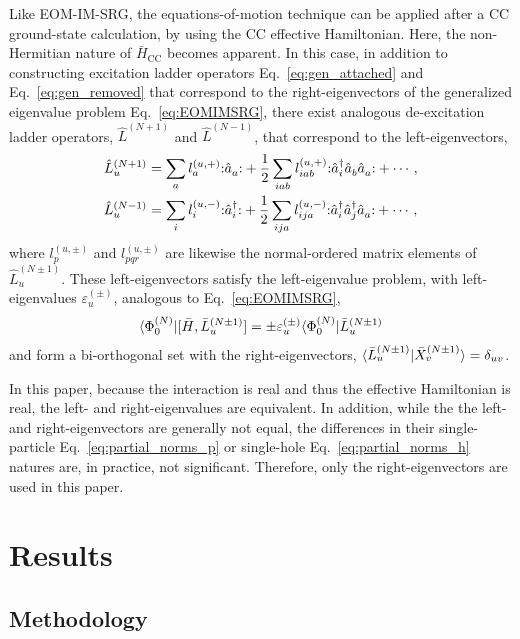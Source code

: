 Like EOM-IM-SRG, the equations-of-motion technique can be applied after a CC ground-state calculation, by using the CC effective Hamiltonian.  Here, the non-Hermitian nature of $\bar{H}_{\mathrm{CC}}$ becomes apparent.  In this case, in addition to constructing excitation ladder operators Eq.\ \eqref{eq:gen_attached} and Eq.\ \eqref{eq:gen_removed} that correspond to the right-eigenvectors of the generalized eigenvalue problem Eq.\ \eqref{eq:EOMIMSRG}, there exist analogous de-excitation ladder operators, $\hat{L}^{(N + 1)}$ and $\hat{L}^{(N - 1)}$, that correspond to the left-eigenvectors,
\begin{align*}
    \hat{L}^{(N + 1)}_u &= \sum_a l^{(u, +)}_a \mathopen: \hat{a}_a^{} \mathclose: + \frac{1}{2} \sum_{i a b} l^{(u, +)}_{i a b} \mathopen: \hat{a}^\dagger_i \hat{a}_b^{} \hat{a}_a^{} \mathclose: + \cdots, \\
    \hat{L}^{(N - 1)}_u &= \sum_i l_i^{(u, -)} \mathopen: \hat{a}^\dagger_i \mathclose: + \frac{1}{2} \sum_{i j a} l^{(u, -)}_{i j a} \mathopen: \hat{a}^\dagger_i \hat{a}^\dagger_j \hat{a}_a^{} \mathclose: + \cdots,
\end{align*}
where $l^{(u, \pm)}_p$ and $l^{(u, \pm)}_{p q r}$ are likewise the normal-ordered matrix elements of $\hat{L}^{(N \pm 1)}_u$.  These left-eigenvectors satisfy the left-eigenvalue problem, with left-eigenvalues $\varepsilon^{(\pm)}_u$, analogous to Eq.\ \eqref{eq:EOMIMSRG},
\begin{align*}
  \langle \Phi^{(N)}_0 | [\bar{H}, \bar{L}^{(N \pm 1)}_u] = \pm \varepsilon^{(\pm)}_u \langle \Phi^{(N)}_0 | \bar{L}^{(N \pm 1)}_u
\end{align*}
and form a bi-orthogonal set with the right-eigenvectors, $\langle \bar{L}^{(N \pm 1)}_u | \bar{X}^{(N \pm 1)}_v\rangle = \delta_{u v}$.

In this paper, because the interaction is real and thus the effective Hamiltonian is real, the left- and right-eigenvalues are equivalent. In addition, while the the left- and right-eigenvectors are generally not equal, the differences in their single-particle Eq.\ \eqref{eq:partial_norms_p} or single-hole Eq.\ \eqref{eq:partial_norms_h} natures are, in practice, not significant.  Therefore, only the right-eigenvectors are used in this paper.

\section{Results}
\label{sec:results}

\subsection{Methodology}
\label{subsec:methodology}

